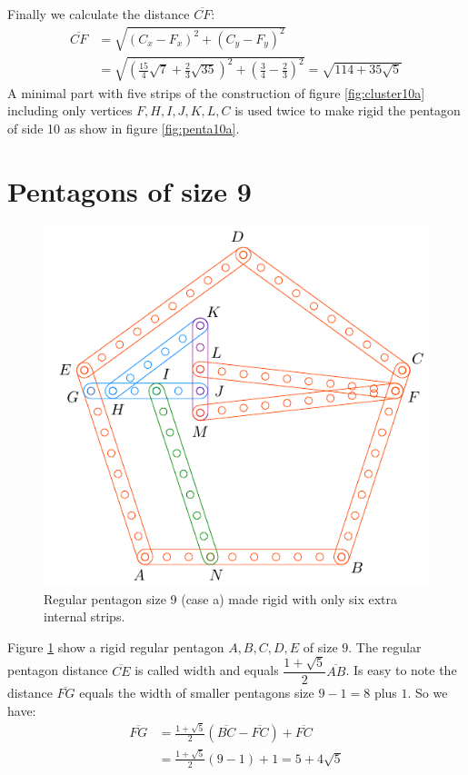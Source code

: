 \documentclass[11pt]{article}
\begin{document}
Finally we calculate the distance $\overline{CF}$:
\begin{align}
\overline{CF} &= \sqrt{(C_x - F_x)^2 + (C_y - F_y)^2}\nonumber\\
 &= \sqrt{\left(\frac{15}{4}\sqrt7 + \frac{2}{3}\sqrt{35}\right)^2
 + \left(\frac{3}4 - \frac{2}3\right)^2} %
 = \sqrt{114+35\sqrt5}
\end{align}
A minimal part with five strips of the construction of figure \ref{fig:cluster10a} including only vertices $F,H,I,J,K,L,C$ is used twice to make rigid the pentagon of side 10 as show in figure \ref{fig:penta10a}.

\section{Pentagons of size 9}

\begin{figure}[h]
 \centering
 \includegraphics[scale=1]{9/penta9a}
 \caption{Regular pentagon size 9 (case a) made rigid with only six extra internal strips.}
 \label{fig:penta9a}
\end{figure}

Figure \ref{fig:penta9a} show a rigid regular pentagon $A,B,C,D,E$ of size $9$. The regular pentagon distance $\overline{CE}$ is called width and equals $\dfrac{1+\sqrt5}{2}\overline{AB}$. Is easy to note the distance $\overline{FG}$ equals the width of smaller pentagons size $9-1=8$ plus $1$. So we have:
\begin{align}
\overline{FG} &= \frac{1+\sqrt5}{2}(\overline{BC}-\overline{FC}) + \overline{FC}\nonumber\\
 &= \frac{1+\sqrt5}{2}(9-1) + 1 = 5 + 4\sqrt5
\end{align}
\end{document}
